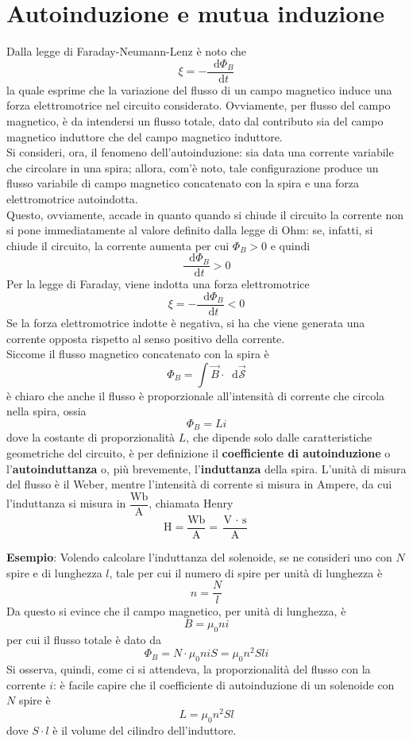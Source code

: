 \documentclass[a4paper]{extarticle}
\newcommand\dif{\mathop{}\!\mathrm{d}}
\begin{document}
\section{Autoinduzione e mutua induzione}
Dalla legge di Faraday-Neumann-Lenz è noto che
\[\xi=-\dfrac{\dif \Phi_B}{\dif t}\]
la quale esprime che la variazione del flusso di un campo magnetico induce una forza elettromotrice nel circuito considerato. Ovviamente, per flusso del campo magnetico, è da intendersi un flusso totale, dato dal contributo sia del campo magnetico induttore che del campo magnetico induttore.\\
Si consideri, ora, il fenomeno dell'autoinduzione: sia data una corrente variabile che circolare in una spira; allora, com'è noto, tale configurazione produce un flusso variabile di campo magnetico concatenato con la spira e una forza elettromotrice autoindotta.\\
Questo, ovviamente, accade in quanto quando si chiude il circuito la corrente non si pone immediatamente al valore definito dalla legge di Ohm: se, infatti, si chiude il circuito, la corrente aumenta per cui $\Phi_B > 0$ e quindi
\[\dfrac{\dif \Phi_B}{\dif t} > 0\]
Per la legge di Faraday, viene indotta una forza elettromotrice
\[\xi=-\dfrac{\dif \Phi_B}{\dif t} < 0\]
Se la forza elettromotrice indotte è negativa, si ha che viene generata una corrente opposta rispetto al senso positivo della corrente.\\
Siccome il flusso magnetico concatenato con la spira è
\[\Phi_B = \int \vec B \cdot \dif \vec{\mathcal{S}}\]
è chiaro che anche il flusso è proporzionale all'intensità di corrente che circola nella spira, ossia
\[\boxed{\Phi_B = Li}\]
dove la costante di proporzionalità $L$, che dipende solo dalle caratteristiche geometriche del circuito, è per definizione il \textbf{coefficiente di autoinduzione} o l'\textbf{autoinduttanza} o, più brevemente, l'\textbf{induttanza} della spira. L'unità di misura del flusso è il Weber, mentre l'intensità di corrente si misura in Ampere, da cui l'induttanza si misura in $\dfrac{\text{Wb}}{\text{A}}$, chiamata Henry
\[\text{H} = \dfrac{\text{Wb}}{\text{A}} = \dfrac{\text{V } \cdot \text{ s}}{\text{A}}\]

\vspace{2em}
\noindent
\textbf{Esempio}: Volendo calcolare l'induttanza del solenoide, se ne consideri uno con $N$ spire e di lunghezza $l$, tale per cui il numero di spire per unità di lunghezza è
\[n=\dfrac{N}{l}\]
Da questo si evince che il campo magnetico, per unità di lunghezza, è
\[B=\mu_0 n i\]
per cui il flusso totale è dato da
\[\Phi_B = N \cdot \mu_0 n i S = \mu_0 n^2 S l i\]
Si osserva, quindi, come ci si attendeva, la proporzionalità del flusso con la corrente $i$: è facile capire che il coefficiente di autoinduzione di un solenoide con $N$ spire è
\[\boxed{L=\mu_0 n^2 S l}\]
dove $S \cdot l$ è il volume del cilindro dell'induttore.
\end{document}
